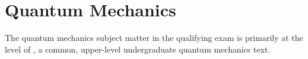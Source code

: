 \newpage
\section{Quantum Mechanics}
\label{sec:qmech}
The quantum mechanics subject matter in the qualifying exam is primarily at the level of \cite{griffithsIntroductionQuantumMechanics2018}, a common, upper-level undergraduate quantum mechanics text.

